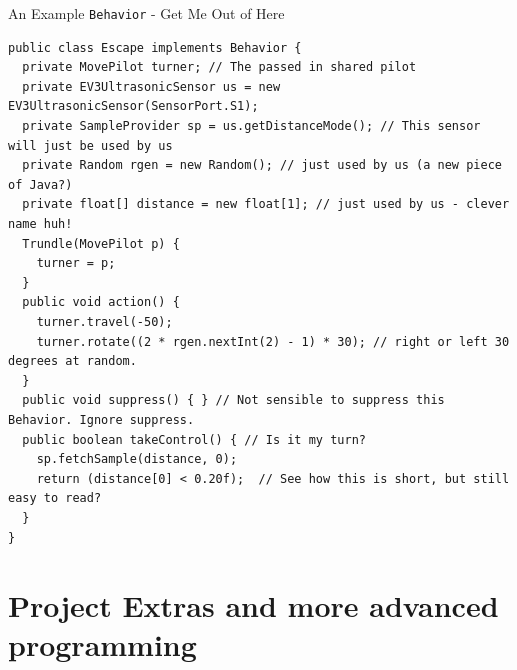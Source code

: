 \documentclass[color=pdftex,usenames,dvipsnames, aspectratio=169]{beamer}
\begin{document}
\begin{frame}[fragile]{An Example \lstinline!Behavior! - Get Me Out of Here}
\begin{lstlisting}[basicstyle=\ttfamily\scriptsize\color{blue}, xleftmargin=0in, linewidth=14cm,emph={Random, pilot, private, public class Backup, Behavior,suppress,takeControl,action}]
public class Escape implements Behavior {
  private MovePilot turner; // The passed in shared pilot
  private EV3UltrasonicSensor us = new EV3UltrasonicSensor(SensorPort.S1);
  private SampleProvider sp = us.getDistanceMode(); // This sensor will just be used by us
  private Random rgen = new Random(); // just used by us (a new piece of Java?)
  private float[] distance = new float[1]; // just used by us - clever name huh!
  Trundle(MovePilot p) {
    turner = p;
  }
  public void action() {
    turner.travel(-50);
    turner.rotate((2 * rgen.nextInt(2) - 1) * 30); // right or left 30 degrees at random.
  }
  public void suppress() { } // Not sensible to suppress this Behavior. Ignore suppress.
  public boolean takeControl() { // Is it my turn?
    sp.fetchSample(distance, 0);
    return (distance[0] < 0.20f);  // See how this is short, but still easy to read?
  }
}
\end{lstlisting}
\end{frame}

\section{Project Extras and more advanced programming}
\end{document}
